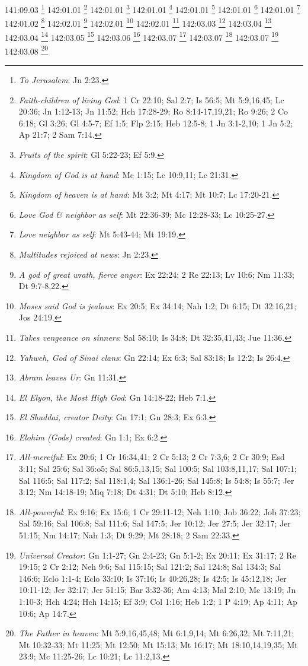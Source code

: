 {{{{{{{{{{{{{{{{{{{{{{{{{{{141:09.03 \footnote{\textit{To Jerusalem}: Jn 2:23.}
142:01.01 \footnote{\textit{Faith-children of living God}: 1 Cr 22:10; Sal 2:7; Is 56:5; Mt 5:9,16,45; Lc 20:36; Jn 1:12-13; Jn 11:52; Hch 17:28-29; Ro 8:14-17,19,21; Ro 9:26; 2 Co 6:18; Gl 3:26; Gl 4:5-7; Ef 1:5; Flp 2:15; Heb 12:5-8; 1 Jn 3:1-2,10; 1 Jn 5:2; Ap 21:7; 2 Sam 7:14.}
142:01.01 \footnote{\textit{Fruits of the spirit}: Gl 5:22-23; Ef 5:9.}
142:01.01 \footnote{\textit{Kingdom of God is at hand}: Mc 1:15; Lc 10:9,11; Lc 21:31.}
142:01.01 \footnote{\textit{Kingdom of heaven is at hand}: Mt 3:2; Mt 4:17; Mt 10:7; Lc 17:20-21.}
142:01.01 \footnote{\textit{Love God & neighbor as self}: Mt 22:36-39; Mc 12:28-33; Lc 10:25-27.}
142:01.01 \footnote{\textit{Love neighbor as self}: Mt 5:43-44; Mt 19:19.}
142:01.02 \footnote{\textit{Multitudes rejoiced at news}: Jn 2:23.}
142:02.01 \footnote{\textit{A god of great wrath, fierce anger}: Ex 22:24; 2 Re 22:13; Lv 10:6; Nm 11:33; Dt 9:7-8,22.}
142:02.01 \footnote{\textit{Moses said God is jealous}: Ex 20:5; Ex 34:14; Nah 1:2; Dt 6:15; Dt 32:16,21; Jos 24:19.}
142:02.01 \footnote{\textit{Takes vengeance on sinners}: Sal 58:10; Is 34:8; Dt 32:35,41,43; Jue 11:36.}
142:03.03 \footnote{\textit{Yahweh, God of Sinai clans}: Gn 22:14; Ex 6:3; Sal 83:18; Is 12:2; Is 26:4.}
142:03.04 \footnote{\textit{Abram leaves Ur}: Gn 11:31.}
142:03.04 \footnote{\textit{El Elyon, the Most High God}: Gn 14:18-22; Heb 7:1.}
142:03.05 \footnote{\textit{El Shaddai, creator Deity}: Gn 17:1; Gn 28:3; Ex 6:3.}
142:03.06 \footnote{\textit{Elohim (Gods) created}: Gn 1:1; Ex 6:2.}
142:03.07 \footnote{\textit{All-merciful}: Ex 20:6; 1 Cr 16:34,41; 2 Cr 5:13; 2 Cr 7:3,6; 2 Cr 30:9; Esd 3:11; Sal 25:6; Sal 36:o5; Sal 86:5,13,15; Sal 100:5; Sal 103:8,11,17; Sal 107:1; Sal 116:5; Sal 117:2; Sal 118:1,4; Sal 136:1-26; Sal 145:8; Is 54:8; Is 55:7; Jer 3:12; Nm 14:18-19; Miq 7:18; Dt 4:31; Dt 5:10; Heb 8:12.}
142:03.07 \footnote{\textit{All-powerful}: Ex 9:16; Ex 15:6; 1 Cr 29:11-12; Neh 1:10; Job 36:22; Job 37:23; Sal 59:16; Sal 106:8; Sal 111:6; Sal 147:5; Jer 10:12; Jer 27:5; Jer 32:17; Jer 51:15; Nm 14:17; Nah 1:3; Dt 9:29; Mt 28:18; 2 Sam 22:33.}
142:03.07 \footnote{\textit{Universal Creator}: Gn 1:1-27; Gn 2:4-23; Gn 5:1-2; Ex 20:11; Ex 31:17; 2 Re 19:15; 2 Cr 2:12; Neh 9:6; Sal 115:15; Sal 121:2; Sal 124:8; Sal 134:3; Sal 146:6; Eclo 1:1-4; Eclo 33:10; Is 37:16; Is 40:26,28; Is 42:5; Is 45:12,18; Jer 10:11-12; Jer 32:17; Jer 51:15; Bar 3:32-36; Am 4:13; Mal 2:10; Mc 13:19; Jn 1:10-3; Hch 4:24; Hch 14:15; Ef 3:9; Col 1:16; Heb 1:2; 1 P 4:19; Ap 4:11; Ap 10:6; Ap 14:7.}
142:03.08 \footnote{\textit{The Father in heaven}: Mt 5:9,16,45,48; Mt 6:1,9,14; Mt 6:26,32; Mt 7:11,21; Mt 10:32-33; Mt 11:25; Mt 12:50; Mt 15:13; Mt 16:17; Mt 18:10,14,19,35; Mt 23:9; Mc 11:25-26; Lc 10:21; Lc 11:2,13.}
}}}}}}}}}}}}}}}}}}}}}}}}}}}
